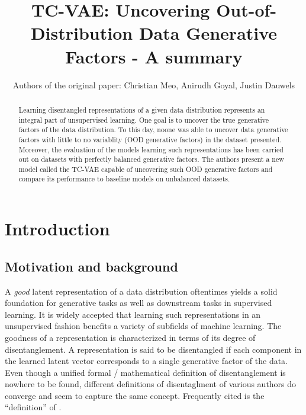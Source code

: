 \documentclass[twoside,11pt]{article}
\begin{document}
\title{TC-VAE: Uncovering Out-of-Distribution Data Generative Factors - A summary}

\author{Authors of the original paper: Christian Meo, Anirudh Goyal, Justin Dauwels}
\maketitle


\begin{abstract}%
  Learning disentangled representations of a given data distribution represents an integral part of unsupervised learning.
  One goal is to uncover the true generative factors of the data distribution.
  To this day, noone was able to uncover data generative factors with little to no variablity (OOD generative factors) in the dataset presented.
  Moreover, the evaluation of the models learning such representations has been carried out on datasets with perfectly balanced generative factors.
  The authors present a new model called the TC-VAE capable of uncovering such OOD generative factors and compare its performance to baseline models on unbalanced datasets.



\end{abstract}

\section{Introduction}

\subsection{Motivation and background}
A \textit{good} latent representation of a data distribution oftentimes yields a solid foundation for generative tasks as well as downstream tasks in supervised learning. It is widely accepted that learning such representations in an unsupervised fashion benefits a variety of subfields of machine learning.
The goodness of a representation is characterized in terms of its degree of disentanglement. A representation is said to be disentangled if each component in the learned latent vector corresponds to a single generative factor of the data. Even though a unified formal / mathematical definition of disentanglement is nowhere to be found, different definitions of disentaglment of various authors do converge and seem to capture the same concept. Frequently cited is the \enquote{definition} of \cite{Bengio_2013}.
\end{document}

